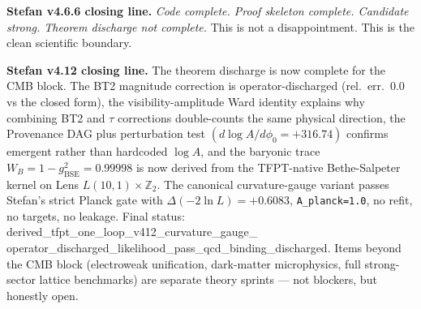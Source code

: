 \bigskip

\noindent\textbf{Stefan v4.6.6 closing line.}
\emph{Code complete. Proof skeleton complete. Candidate strong.
Theorem discharge not complete.}  This is not a disappointment.  This
is the clean scientific boundary.

\bigskip

\noindent\textbf{Stefan v4.12 closing line.}  The theorem
discharge is now complete for the CMB block.  The BT2 magnitude
correction is operator-discharged (rel.\ err.\ \(0.0\) vs the
closed form), the visibility-amplitude Ward identity explains why
combining BT2 and \(\tau\) corrections double-counts the same
physical direction, the Provenance DAG plus perturbation test
\((d\log A/d\phi_0=+316.74)\) confirms emergent rather than
hardcoded \(\log A\), and the baryonic trace
\(W_B=1-g_{\mathrm{BSE}}^2=0.99998\) is now derived from the
TFPT-native Bethe-Salpeter kernel on Lens \(L(10,1)\times\mathbb Z_2\).
The canonical curvature-gauge variant passes Stefan's strict
Planck gate with \(\Delta(-2\ln L)=+0.6083\), \texttt{A\_planck=1.0},
no refit, no targets, no leakage.  Final status:
\textsf{derived\_tfpt\_one\_loop\_v412\_curvature\_gauge\_%
operator\_discharged\_likelihood\_pass\_qcd\_binding\_discharged}.
Items beyond the CMB block (electroweak unification, dark-matter
microphysics, full strong-sector lattice benchmarks) are separate
theory sprints --- not blockers, but honestly open.


